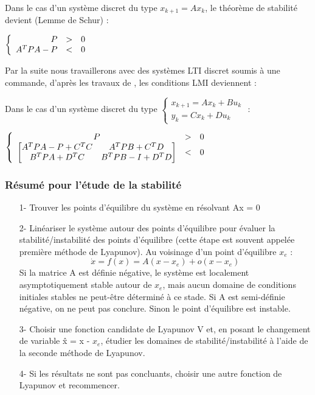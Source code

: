 \begin{theo}
	Dans le cas d'un système discret du type $x_{k+1} = Ax_k$, le théorème de stabilité devient (Lemme de Schur) :
	\begin{center}
		$   \left \{
		\begin{array}{r c l}
		P & > & 0 \\
		A^TPA - P & < & 0
		\end{array}
		\right. $
	\end{center}
	\label{theo:lyapDiscret}
\end{theo}

Par la suite nous travaillerons avec des systèmes LTI discret soumis à une commande, d'après les travaux de \cite{zhai_analysis_2007}, les conditions LMI deviennent : 
\begin{theo}
	Dans le cas d'un système discret du type $   \left \{
	\begin{array}{l}
	x_{k+1} = Ax_k + Bu_k \\
	y_k = Cx_k + Du_k
	\end{array}
	\right. $ :
	\begin{center}		
		$   \left \{
		\begin{array}{c c l}
		P & > & 0 \\
		\begin{bmatrix}
		A^TPA-P+C^TC	& A^TPB + C^TD \\ 
		B^TPA + D^TC	& B^TPB - I + D^TD  
		\end{bmatrix} & < & 0
		\end{array}
		\right. $
	\end{center}
	\label{theo:lyapDiscretAvecEntree}
\end{theo}
\subsubsection{Résumé pour l'étude de la stabilité}
\begin{itemize}
\item[1-] Trouver les points d'équilibre du système en résolvant Ax = 0
\item[2-] Linéariser le système autour des points d'équilibre pour évaluer la stabilité/instabilité des points d'équilibre (cette étape est souvent appelée première méthode de Lyapunov). Au voisinage d'un point d'équilibre $x_e$ :
\[\dot{x} = f(x) = A(x-x_e) + o(x-x_e)\]
Si la matrice A est définie négative, le système est localement asymptotiquement stable autour de $x_e$, mais aucun domaine de conditions initiales stables ne peut-être déterminé à ce stade.
Si A est semi-définie négative, on ne peut pas conclure. Sinon le point d'équilibre est instable.
\item[3-] Choisir une fonction candidate de Lyapunov V et, en posant le changement de variable \^{x} = x - $x_e$, étudier les domaines de stabilité/instabilité à l'aide de la seconde méthode de Lyapunov.
\item[4-] Si les résultats ne sont pas concluants, choisir une autre fonction de Lyapunov et recommencer.
\end{itemize}


